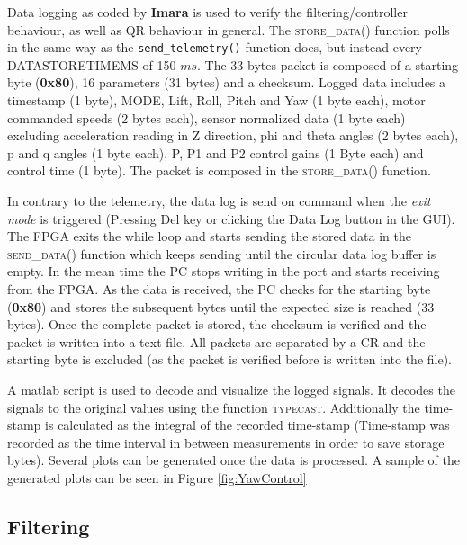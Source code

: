 \documentclass{article}
\begin{document}
Data logging as coded by \textbf{Imara} is used to verify the filtering/controller behaviour, as well as QR behaviour in general. The \textsc{store\_data()} function polls in the same way as the \texttt{send\_telemetry()} function does, but instead every \textsc{DATASTORETIMEMS} of 150 $ms$. The 33 bytes packet is composed of a starting byte (\textbf{0x80}), 16 parameters (31 bytes) and a checksum. Logged data includes a timestamp (1 byte), MODE, Lift, Roll, Pitch and Yaw (1 byte each), motor commanded speeds (2 bytes each), sensor normalized data (1 byte each) excluding acceleration reading in Z direction, phi and theta angles (2 bytes each), p and q angles (1 byte each), P, P1 and P2 control gains (1 Byte each) and control time (1 byte). The packet is composed in the \textsc{store\_data()} function. 

In contrary to the telemetry, the data log is send on command when the \emph{exit mode} is triggered (Pressing Del key or clicking the Data Log button in the GUI). The FPGA exits the while loop and starts sending the stored data in the \textsc{send\_data()} function which keeps sending until the circular data log buffer is empty. In the mean time the PC stops writing in the port and starts receiving from the FPGA. As the data is received, the PC checks for the starting byte (\textbf{0x80}) and stores the subsequent bytes until the expected size is reached (33 bytes). Once the complete packet is stored, the checksum is verified and the packet is written into a text file. All packets are separated by a CR and the starting byte is excluded (as the packet is verified before is written into the file).

A matlab script is used to decode and visualize the logged signals. It decodes the signals to the original values using the function \textsc{typecast}. Additionally the time-stamp is calculated as the integral of the recorded time-stamp (Time-stamp was recorded as the time interval in between measurements in order to save storage bytes). Several plots can be generated once the data is processed. A sample of the generated plots can be seen in Figure \ref{fig:YawControl}


\subsection{Filtering}
\label{sec:filtering}
\end{document}
